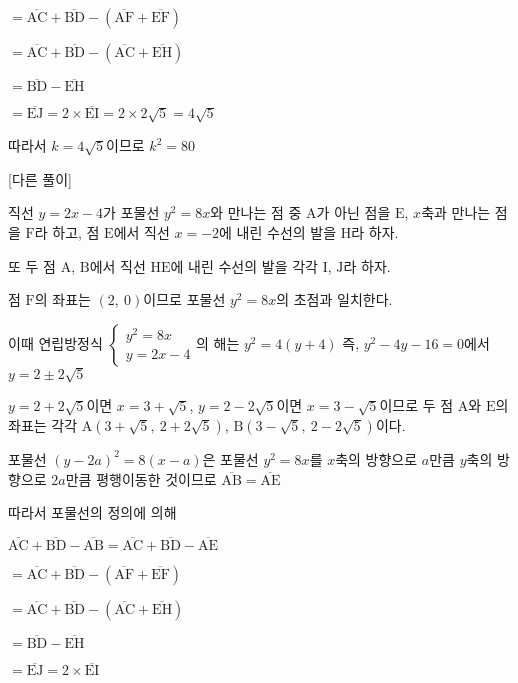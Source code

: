 \documentclass{oblivoir}
\begin{document}
$=\overline{\mathrm{AC}} +\overline{\mathrm{BD}} -(\overline{\mathrm{AF}} +\overline{\mathrm{EF}})$

$=\overline{\mathrm{AC}} +\overline{\mathrm{BD}} -(\overline{\mathrm{AC}} +\overline{\mathrm{EH}})$

$=\overline{\mathrm{BD}} -\overline{\mathrm{EH}}$

$=\overline{\mathrm{EJ}}$$= 2\times\overline{\mathrm{EI}}$$= 2\times 2\sqrt{5}= 4\sqrt{5}$

따라서 $k = 4\sqrt{5}$이므로 $k^{2}= 80$

[다른 풀이]

직선 $y = 2x - 4$가 포물선 $y^{2}= 8x$와 만나는 점 중 $\mathrm{A}$가 아닌 점을 $\mathrm{E}$, $x$축과 만나는 점을 $\mathrm{F}$라 하고, 점 $\mathrm{E}$에서 직선 $x = -2$에 내린 수선의 발을 $\mathrm{H}$라 하자.

또 두 점 $\mathrm{A}$, $\mathrm{B}$에서 직선 $\mathrm{HE}$에 내린 수선의 발을 각각 $\mathrm{I}$, $\mathrm{J}$라 하자.

점  $\mathrm{F}$의 좌표는 $(2,\:0)$이므로 포물선 $y^{2}= 8x$의 초점과 일치한다. 

이때 연립방정식 $\begin{cases}
y^{2}=8x\\
y=2x-4
\end{cases}$의 해는 $y^{2}= 4(y+ 4)$ 즉, $y^{2}- 4y - 16 = 0$에서 $y=2\pm 2\sqrt{5}$

$y=2+2\sqrt{5}$이면 $x=3+\sqrt{5}$, $y=2-2\sqrt{5}$이면 $x=3-\sqrt{5}$이므로 두 점 $\mathrm{A}$와 $\mathrm{E}$의 좌표는 각각 $\mathrm{A}(3+\sqrt{5},\:2+2\sqrt{5})$, $\mathrm{B}(3-\sqrt{5},\:2-2\sqrt{5})$이다.

포물선 $(y-2a)^{2}= 8(x- a)$은 포물선 $y^{2}= 8x$를 $x$축의 방향으로 $a$만큼 $y$축의 방향으로 $2a$만큼 평행이동한 것이므로 $\overline{\mathrm{AB}} =\overline{\mathrm{AE}}$

따라서 포물선의 정의에 의해 

$\overline{\mathrm{AC}}+\overline{\mathrm{BD}}-\overline{\mathrm{AB}}$$=\overline{\mathrm{AC}} +\overline{\mathrm{BD}} -\overline{\mathrm{AE}}$

$=\overline{\mathrm{AC}} +\overline{\mathrm{BD}} -(\overline{\mathrm{AF}} +\overline{\mathrm{EF}})$

$=\overline{\mathrm{AC}} +\overline{\mathrm{BD}} -(\overline{\mathrm{AC}} +\overline{\mathrm{EH}})$

$=\overline{\mathrm{BD}} -\overline{\mathrm{EH}}$

$=\overline{\mathrm{EJ}}$$= 2\times\overline{\mathrm{EI}}$
\end{document}
